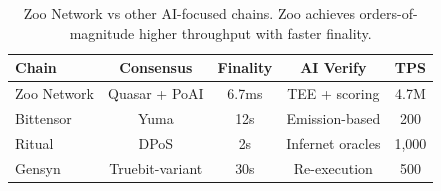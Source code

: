 \begin{table}[t]
\centering
\begin{tabular}{lcccc}
\toprule
\textbf{Chain} & \textbf{Consensus} & \textbf{Finality} & \textbf{AI Verify} & \textbf{TPS} \\
\midrule
Zoo Network & Quasar + PoAI & 6.7ms & TEE + scoring & 4.7M \\
Bittensor & Yuma & 12s & Emission-based & 200 \\
Ritual & DPoS & 2s & Infernet oracles & 1,000 \\
Gensyn & Truebit-variant & 30s & Re-execution & 500 \\
\bottomrule
\end{tabular}
\caption{Zoo Network vs other AI-focused chains. Zoo achieves orders-of-magnitude higher throughput with faster finality.}
\label{tab:ai-chains}
\end{table}

